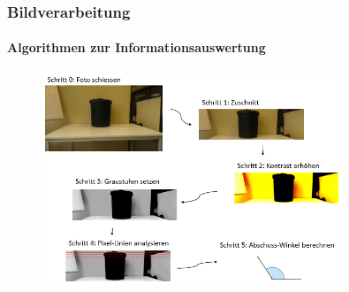 \begin{frame}
\begin{columns}
	\end{columns}
	
	
\end{frame}

\begin{frame}
	\frametitle{Bildverarbeitung\hfill{}\footnotesize \group}
	\framesubtitle{Algorithmen zur Informationsauswertung}
	
	\begin{figure}
		\centering
		\includegraphics[width=0.8\textwidth]{../../fig/ablauf-ortung-des-korbes-algorithmus.png}
	\end{figure}
	
	

	
\end{frame}

